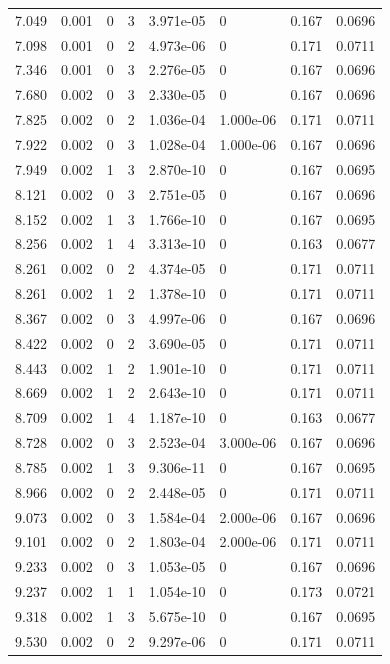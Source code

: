 \documentclass[preview]{standalone}
\begin{document}
{{{\begin{tabular}{L{1.2cm}C{1.2cm} C{0.3cm}C{0.5cm} C{1.4cm}C{1.4cm} C{1.4cm}C{1.4cm}}
  7.049  &  0.001  & 0     &  3 &  3.971e-05  & 0  & 0.167 &  0.0696   \\ 
  7.098  &  0.001  & 0     &  2 &  4.973e-06  & 0  & 0.171 &  0.0711   \\ 
  7.346  &  0.001  & 0     &  3 &  2.276e-05  & 0  & 0.167 &  0.0696   \\ 
  7.680  &  0.002  & 0     &  3 &  2.330e-05  & 0  & 0.167 &  0.0696   \\ 
  7.825  &  0.002  & 0     &  2 &  1.036e-04  & 1.000e-06  & 0.171 &  0.0711   \\ 
  7.922  &  0.002  & 0     &  3 &  1.028e-04  & 1.000e-06  & 0.167 &  0.0696   \\ 
  7.949  &  0.002  & 1     &  3 &  2.870e-10  & 0  & 0.167 &  0.0695   \\ 
  8.121  &  0.002  & 0     &  3 &  2.751e-05  & 0  & 0.167 &  0.0696   \\ 
  8.152  &  0.002  & 1     &  3 &  1.766e-10  & 0  & 0.167 &  0.0695   \\ 
  8.256  &  0.002  & 1     &  4 &  3.313e-10  & 0  & 0.163 &  0.0677   \\ 
  8.261  &  0.002  & 0     &  2 &  4.374e-05  & 0  & 0.171 &  0.0711   \\ 
  8.261  &  0.002  & 1     &  2 &  1.378e-10  & 0  & 0.171 &  0.0711   \\ 
  8.367  &  0.002  & 0     &  3 &  4.997e-06  & 0  & 0.167 &  0.0696   \\ 
  8.422  &  0.002  & 0     &  2 &  3.690e-05  & 0  & 0.171 &  0.0711   \\ 
  8.443  &  0.002  & 1     &  2 &  1.901e-10  & 0  & 0.171 &  0.0711   \\ 
  8.669  &  0.002  & 1     &  2 &  2.643e-10  & 0  & 0.171 &  0.0711   \\ 
  8.709  &  0.002  & 1     &  4 &  1.187e-10  & 0  & 0.163 &  0.0677   \\ 
  8.728  &  0.002  & 0     &  3 &  2.523e-04  & 3.000e-06  & 0.167 &  0.0696   \\ 
  8.785  &  0.002  & 1     &  3 &  9.306e-11  & 0  & 0.167 &  0.0695   \\ 
  8.966  &  0.002  & 0     &  2 &  2.448e-05  & 0  & 0.171 &  0.0711   \\ 
  9.073  &  0.002  & 0     &  3 &  1.584e-04  & 2.000e-06  & 0.167 &  0.0696   \\ 
  9.101  &  0.002  & 0     &  2 &  1.803e-04  & 2.000e-06  & 0.171 &  0.0711   \\ 
  9.233  &  0.002  & 0     &  3 &  1.053e-05  & 0  & 0.167 &  0.0696   \\ 
  9.237  &  0.002  & 1     &  1 &  1.054e-10  & 0  & 0.173 &  0.0721   \\ 
  9.318  &  0.002  & 1     &  3 &  5.675e-10  & 0  & 0.167 &  0.0695   \\ 
  9.530  &  0.002  & 0     &  2 &  9.297e-06  & 0  & 0.171 &  0.0711   \\ 
\hline 
\end{tabular} 

}}}
\end{document}
